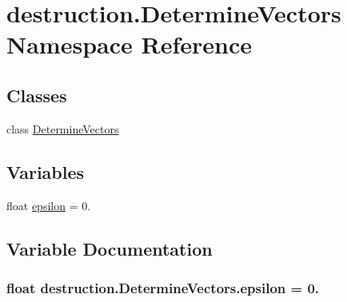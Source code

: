 \hypertarget{namespacedestruction_1_1_determine_vectors}{\section{destruction.\-Determine\-Vectors Namespace Reference}
\label{namespacedestruction_1_1_determine_vectors}
}
\subsection*{Classes}
\begin{DoxyCompactItemize}
\item 
class \hyperlink{classdestruction_1_1_determine_vectors_1_1_determine_vectors}{Determine\-Vectors}
\end{DoxyCompactItemize}
\subsection*{Variables}
\begin{DoxyCompactItemize}
\item 
float \hyperlink{namespacedestruction_1_1_determine_vectors_a45106db9f892bc821e338f103a9aa662}{epsilon} = 0.
\end{DoxyCompactItemize}


\subsection{Variable Documentation}
\hypertarget{namespacedestruction_1_1_determine_vectors_a45106db9f892bc821e338f103a9aa662}{
\subsubsection[{epsilon}]{\setlength{\rightskip}{0pt plus 5cm}float destruction.\-Determine\-Vectors.\-epsilon = 0.}}\label{namespacedestruction_1_1_determine_vectors_a45106db9f892bc821e338f103a9aa662}
